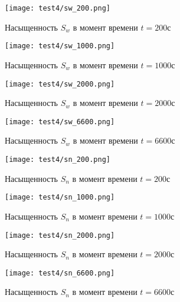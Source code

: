 \begin{figure}
  \begin{center}
    \begin{minipage}[h]{0.49\textwidth}
       \texttt{[image: test4/sw\_200.png]}
       \vspace{1cm}
       \caption{Насыщенность $S_w$ в момент времени $t=200$с}
    \end{minipage}
    \hfill
    \begin{minipage}[h]{0.49\textwidth}
       \texttt{[image: test4/sw\_1000.png]}
       \vspace{1cm}
       \caption{Насыщенность $S_w$ в момент времени $t=1000$с}
    \end{minipage}
    \vspace{3cm}
    \vfill
    \begin{minipage}[h]{0.49\textwidth}
       \texttt{[image: test4/sw\_2000.png]}
       \vspace{1cm}
       \caption{Насыщенность $S_w$ в момент времени $t=2000$с}
    \end{minipage}
    \hfill
    \begin{minipage}[h]{0.49\textwidth}
       \texttt{[image: test4/sw\_6600.png]}
       \vspace{1cm}
       \caption{Насыщенность $S_w$ в момент времени $t=6600$с}
    \end{minipage}
    \hfill  
  \end{center}
\end{figure}

\begin{figure}
  \begin{center}
    \begin{minipage}[h]{0.49\textwidth}
       \texttt{[image: test4/sn\_200.png]}
       \vspace{1cm}
       \caption{Насыщенность $S_n$ в момент времени $t=200$с}
    \end{minipage}
    \hfill
    \begin{minipage}[h]{0.49\textwidth}
       \texttt{[image: test4/sn\_1000.png]}
       \vspace{1cm}
       \caption{Насыщенность $S_n$ в момент времени $t=1000$с}
    \end{minipage}
    \vspace{3cm}
    \vfill
    \begin{minipage}[h]{0.49\textwidth}
       \texttt{[image: test4/sn\_2000.png]}
       \vspace{1cm}
       \caption{Насыщенность $S_n$ в момент времени $t=2000$с}
    \end{minipage}
    \hfill
    \begin{minipage}[h]{0.49\textwidth}
       \texttt{[image: test4/sn\_6600.png]}
       \vspace{1cm}
       \caption{Насыщенность $S_n$ в момент времени $t=6600$с}
    \end{minipage}
    \hfill  
  \end{center}
\end{figure}

